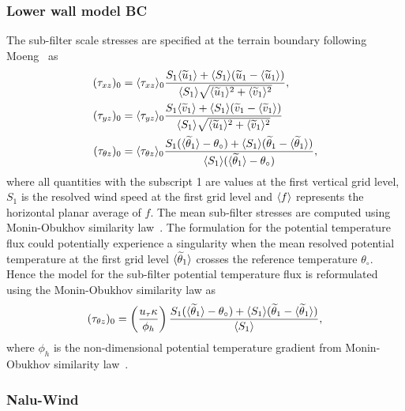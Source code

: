 \subsubsection{\label{sec:wallmodelBC}Lower wall model BC}
The sub-filter scale stresses are specified at the terrain boundary following
Moeng~\cite{Moeng1984} as
\begin{align}
 (\tau_{xz})_0 &= \langle \tau_{xz} \rangle_0 \frac{S_1 \langle \widetilde{u}_1 \rangle + \langle S_1 \rangle (\widetilde{u}_1 - \langle \widetilde{u}_1 \rangle ) }{ \langle S_1 \rangle \sqrt{\langle \widetilde{u}_1 \rangle^2 + \langle \widetilde{v}_1 \rangle^2 } } , \\
 (\tau_{yz})_0 &= \langle \tau_{yz} \rangle_0 \frac{S_1 \langle \widetilde{v}_1 \rangle + \langle S_1 \rangle (\widetilde{v}_1 - \langle \widetilde{v}_1 \rangle ) }{ \langle S_1 \rangle \sqrt{\langle \widetilde{u}_1 \rangle^2 + \langle \widetilde{v}_1 \rangle^2 } } \\
  (\tau_{\theta z})_0 &= \langle \tau_{\theta z} \rangle_0 \frac{S_1 ( \langle \widetilde{\theta}_1 \rangle - \theta_{\circ} ) + \langle S_1 \rangle (\widetilde{\theta}_1 - \langle \widetilde{\theta}_1 \rangle ) }{ \langle S_1 \rangle ( \langle \widetilde{\theta}_1 \rangle - \theta_{\circ} ) },
\end{align}
where all quantities with the subscript 1 are values at the first vertical grid
level, $S_1$ is the resolved wind speed at the first grid level and
$\langle f \rangle$ represents the horizontal planar average of $f$. The mean
sub-filter stresses are computed using Monin-Obukhov similarity
law~\cite{Etling1996}. The formulation for the potential temperature flux could
potentially experience a singularity when the mean resolved potential
temperature at the first grid level $\langle \widetilde{\theta}_1 \rangle$ crosses the
reference temperature $\theta_{\circ}$. Hence the model for the sub-filter
potential temperature flux is reformulated using the Monin-Obukhov similarity
law as
\begin{equation}
(\tau_{\theta z})_0 = \left ( \frac{u_{\tau} \kappa}{ \phi_h} \right ) \frac{S_1 ( \langle \widetilde{\theta}_1 \rangle - \theta_{\circ} ) + \langle S_1 \rangle (\widetilde{\theta}_1 - \langle \widetilde{\theta}_1 \rangle ) }{ \langle S_1 \rangle },
\end{equation}
where $\phi_h$ is the non-dimensional potential temperature gradient from
Monin-Obukhov similarity law~\cite{Etling1996}.


\subsubsection{Nalu-Wind}

